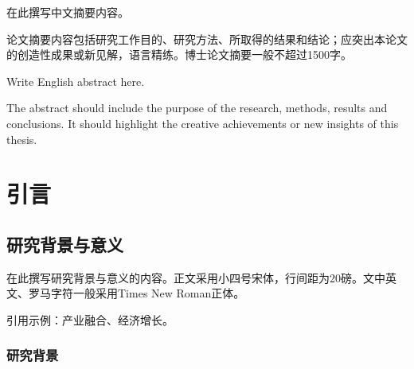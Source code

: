 \documentclass[]{CAUthesis}
\author{张三}                               %
\date{2025年6月}                             %
\begin{document}
\makecover{}

\makedeclaration{}

\frontmatter{}

\begin{abstractcn}
  在此撰写中文摘要内容。

  论文摘要内容包括研究工作目的、研究方法、所取得的结果和结论；应突出本论文的创造性成果或新见解，语言精练。博士论文摘要一般不超过1500字。
\end{abstractcn}

\begin{abstracten}
  Write English abstract here.

  The abstract should include the purpose of the research, methods, results and conclusions. It should highlight the creative achievements or new insights of this thesis.
\end{abstracten}

\tableofcontents{}

\makelistoffiguresandtables{}

\makesymboltable{}

\mainmatter{}

\chapter{引言}

\section{研究背景与意义}

在此撰写研究背景与意义的内容。正文采用小四号宋体，行间距为20磅。文中英文、罗马字符一般采用Times New Roman正体。

引用示例：产业融合\parencite{tiancaihong2024}、经济增长\parencite{zhang2023}。

\subsection{研究背景}
\end{document}
